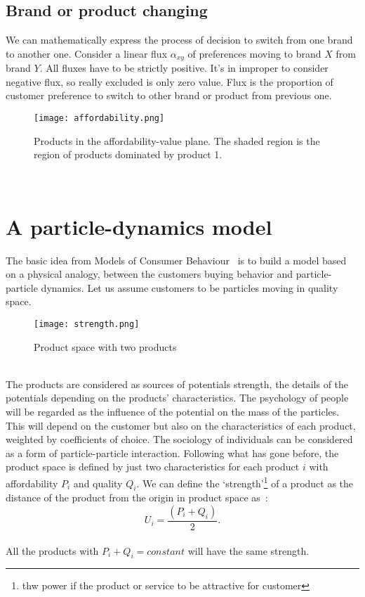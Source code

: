 \subsection{Brand or product changing} \label{subsec:brand}
We can mathematically express the process of decision to switch from one brand to another one.
Consider a linear flux $\alpha_{xy}$ of preferences moving to brand $X$ from brand $Y$.
All fluxes have to be strictly positive.
It's in improper to consider negative flux, so really excluded is only zero value.
Flux is the proportion of customer preference to switch to other brand or product from previous one.
\begin{figure}[h!]
	\begin{center}
		\texttt{[image: affordability.png]}
	\end{center}
	\caption{Products in the affordability-value plane.
	The shaded region is the region of products dominated by product 1.}
	\label{Affordability of products~\cite{pantland}}
\end{figure}
\\
\section{A particle-dynamics model} \label{sec:dynamic}
The basic idea from Models of Consumer Behaviour~\cite{patel} is to build a model based on a physical analogy,
between the customers buying behavior and particle-particle dynamics. Let us assume customers to be particles moving in quality space.
\begin{figure}[h!]
	\begin{center}
		\texttt{[image: strength.png]}
	\end{center}
	\caption{Product space with two products}
	\label{Strength of products~\cite{patel}}
\end{figure}
\\
The products are considered as sources of  potentials strength, the details of the potentials depending on the products’ characteristics.
The psychology of people will be regarded as the influence of the potential on the mass of the particles.
This will depend on the customer but also on the characteristics of each product, weighted by coefficients of choice.
The sociology of individuals can be considered as a form of particle-particle interaction. Following what has gone before,
the product space is defined by just two characteristics for each product $i$ with affordability $P_i$ and quality $Q_i$.
We can define the ‘strength’\footnote{ thw power if the product or service to be attractive for customer} of a product as
the distance of the product from the origin in product space as~\cite{pantland}:
\\
\begin{equation} \label{eq:10}
U_i = \frac{(P_i + Q_i)}{2}.
\end{equation}
\\
All the products with $P_i + Q_i = constant$ will have the same strength.

